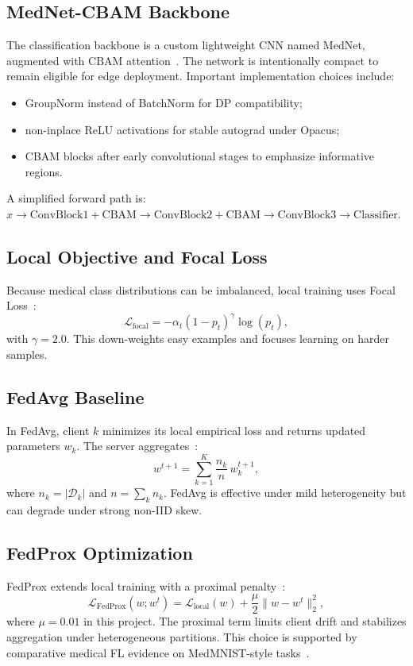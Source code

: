 \subsection{MedNet-CBAM Backbone}
The classification backbone is a custom lightweight CNN named MedNet,
augmented with CBAM attention~\cite{woo2018cbam}. The network is
intentionally compact to remain eligible for edge deployment. Important
implementation choices include:
\begin{itemize}[leftmargin=*]
  \item GroupNorm instead of BatchNorm for DP compatibility;
  \item non-inplace ReLU activations for stable autograd under Opacus;
  \item CBAM blocks after early convolutional stages to emphasize
        informative regions.
\end{itemize}
A simplified forward path is:
$x \rightarrow \text{ConvBlock1} + \text{CBAM} \rightarrow
\text{ConvBlock2} + \text{CBAM} \rightarrow \text{ConvBlock3}
\rightarrow \text{Classifier}$.

\subsection{Local Objective and Focal Loss}
Because medical class distributions can be imbalanced, local training uses
Focal Loss~\cite{lin2017focal}:
\begin{equation}
\mathcal{L}_{\text{focal}} = -\alpha_t (1 - p_t)^{\gamma} \log(p_t),
\end{equation}
with $\gamma = 2.0$. This down-weights easy examples and focuses learning on
harder samples.

\subsection{FedAvg Baseline}
In FedAvg, client $k$ minimizes its local empirical loss and returns updated
parameters $w_k$. The server aggregates~\cite{mcmahan2017communication}:
\begin{equation}
w^{t+1} = \sum_{k=1}^{K} \frac{n_k}{n} \, w_k^{t+1},
\end{equation}
where $n_k = |\mathcal{D}_k|$ and $n = \sum_k n_k$. FedAvg is effective
under mild heterogeneity but can degrade under strong non-IID skew.

\subsection{FedProx Optimization}
FedProx extends local training with a proximal
penalty~\cite{li2020fedprox,yuan2022convergence}:
\begin{equation}
\mathcal{L}_{\text{FedProx}}(w; w^t) = \mathcal{L}_{\text{local}}(w)
+ \frac{\mu}{2} \| w - w^t \|_2^2,
\end{equation}
where $\mu = 0.01$ in this project. The proximal term limits client drift
and stabilizes aggregation under heterogeneous partitions. This choice is
supported by comparative medical FL evidence on MedMNIST-style
tasks~\cite{riyadi2026comparative}.

